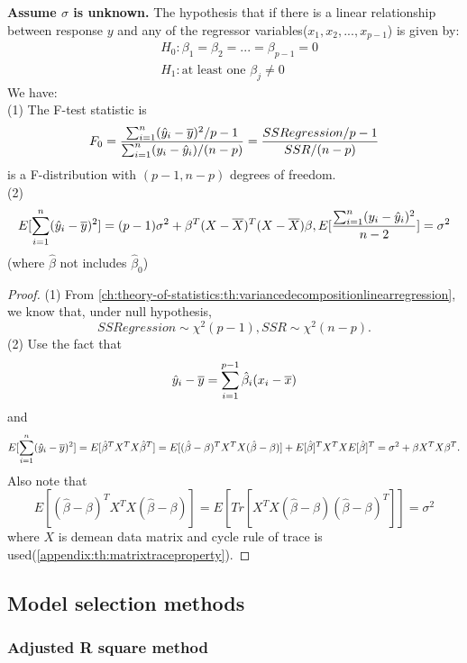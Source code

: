 \begin{refsection}
\begin{lemma}\cite[80]{montgomery2012introduction}\label{ch:statistical-models:th:LackOfFitFtestMultipleRegression}
	\textbf{Assume $\sigma$ is unknown.}
	The hypothesis that if there is a linear relationship between response $y$ and any of the regressor variables($x_1,x_2,...,x_{p-1}$) is given by:
	\begin{align*}
	&H_0: \beta_1 = \beta_2 = ... = \beta_{p-1} = 0\\
	&H_1: \text{at least one }\beta_j \neq 0
	\end{align*}
	We have:\\
	(1)
	The F-test statistic is
	$$F_0 = \frac{\sum_{i=1}^n (\hat{y}_i - \overline{y})^2/p-1}{\sum_{i=1}^n (y_i-\hat{y}_i)/(n-p)} = \frac{SSRegression/p-1}{SSR/(n-p)}$$
	is a F-distribution with $(p-1,n-p)$ degrees of freedom.\\
	(2)  $$E[\sum_{i=1}^n (\hat{y}_i - \overline{y})^2] = (p-1)\sigma^2 + \beta^T(X-\overline{X})^T(X-\overline{X})\beta, E[\frac{\sum_{i=1}^n (y_i - \hat{y}_i)^2}{n-2}]=\sigma^2$$ 
	(where $\hat{\beta}$ not includes $\hat{\beta}_0$)
\end{lemma}
\begin{proof}
	(1)  From \autoref{ch:theory-of-statistics:th:variancedecompositionlinearregression}, we know that, under null hypothesis,  $$SSRegression \sim \chi^2(p-1), SSR\sim \chi^2(n-p).$$ 
	(2)	Use the fact that
	$$\hat{y}_i - \overline{y} =\sum_{i=1}^{p-1} \hat{\beta}_i (x_i-\overline{x}) $$
	and 
	$$E[\sum_{i=1}^n (\hat{y}_i - \overline{y})^2]=E[\hat{\beta}^TX^TX\hat{\beta}^T] = E[(\hat{\beta}-\beta)^TX^TX(\hat{\beta}-\beta)] + E[\hat{\beta}]^TX^TXE[\hat{\beta}]^T = \sigma^2 + \beta X^TX \beta^T.$$
	Also note that
	$$E[(\hat{\beta}-\beta)^TX^TX(\hat{\beta}-\beta)] = E[Tr[X^TX(\hat{\beta}-\beta)(\hat{\beta}-\beta)^T]] = \sigma^2$$
	where $X$ is demean data matrix and cycle rule of trace is used(\autoref{appendix:th:matrixtraceproperty}).
\end{proof}

\subsection{Model selection methods}
\subsubsection{Adjusted R square method}
\begin{definition}
	

\end{definition}
\end{refsection}
